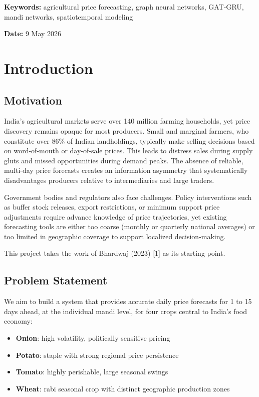 \documentclass[12pt]{article}
\begin{document}
\noindent\textbf{Keywords:} agricultural price forecasting, graph neural networks, GAT-GRU, mandi networks, spatiotemporal modeling

\textbf{Date:} 9 May 2026

\section{Introduction}

\subsection{Motivation}

India's agricultural markets serve over 140 million farming households, yet price discovery remains opaque for most producers. Small and marginal farmers, who constitute over 86\% of Indian landholdings, typically make selling decisions based on word-of-mouth or day-of-sale prices. This leads to distress sales during supply gluts and missed opportunities during demand peaks. The absence of reliable, multi-day price forecasts creates an information asymmetry that systematically disadvantages producers relative to intermediaries and large traders.

Government bodies and regulators also face challenges. Policy interventions such as buffer stock releases, export restrictions, or minimum support price adjustments require advance knowledge of price trajectories, yet existing forecasting tools are either too coarse (monthly or quarterly national averages) or too limited in geographic coverage to support localized decision-making.

This project takes the work of Bhardwaj (2023) [1] as its starting point.

\subsection{Problem Statement}

We aim to build a system that provides accurate daily price forecasts for 1 to 15 days ahead, at the individual mandi level, for four crops central to India's food economy:

\begin{itemize}
\item \textbf{Onion}: high volatility, politically sensitive pricing
\item \textbf{Potato}: staple with strong regional price persistence
\item \textbf{Tomato}: highly perishable, large seasonal swings
\item \textbf{Wheat}: rabi seasonal crop with distinct geographic production zones
\end{itemize}
\end{document}
